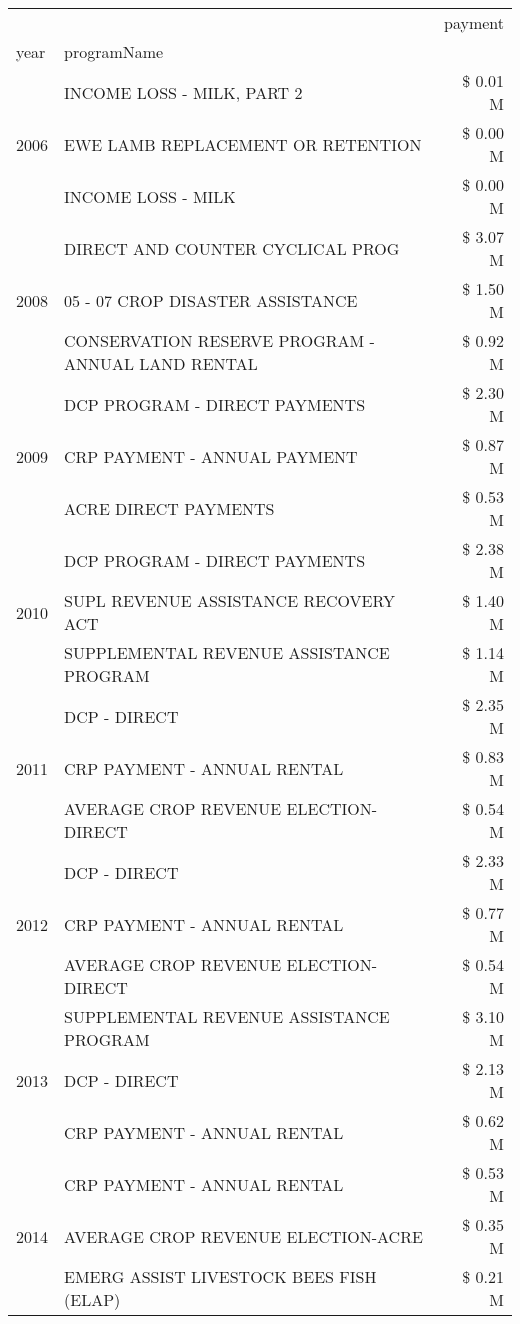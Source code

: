 \begin{tabular}{llr}
\toprule
 &  & payment \\
year & programName &  \\
\midrule
\multirow[t]{3}{*}{2006} & INCOME LOSS - MILK, PART 2 & \$ 0.01 M \\
 & EWE LAMB REPLACEMENT OR RETENTION & \$ 0.00 M \\
 & INCOME LOSS - MILK & \$ 0.00 M \\
\cline{1-3}
\multirow[t]{3}{*}{2008} & DIRECT AND COUNTER CYCLICAL PROG & \$ 3.07 M \\
 & 05 - 07 CROP DISASTER ASSISTANCE & \$ 1.50 M \\
 & CONSERVATION RESERVE PROGRAM - ANNUAL LAND RENTAL & \$ 0.92 M \\
\cline{1-3}
\multirow[t]{3}{*}{2009} & DCP PROGRAM - DIRECT PAYMENTS & \$ 2.30 M \\
 & CRP PAYMENT - ANNUAL PAYMENT & \$ 0.87 M \\
 & ACRE DIRECT PAYMENTS & \$ 0.53 M \\
\cline{1-3}
\multirow[t]{3}{*}{2010} & DCP PROGRAM - DIRECT PAYMENTS & \$ 2.38 M \\
 & SUPL REVENUE ASSISTANCE RECOVERY ACT & \$ 1.40 M \\
 & SUPPLEMENTAL REVENUE ASSISTANCE PROGRAM & \$ 1.14 M \\
\cline{1-3}
\multirow[t]{3}{*}{2011} & DCP - DIRECT & \$ 2.35 M \\
 & CRP PAYMENT - ANNUAL RENTAL & \$ 0.83 M \\
 & AVERAGE CROP REVENUE ELECTION-DIRECT & \$ 0.54 M \\
\cline{1-3}
\multirow[t]{3}{*}{2012} & DCP - DIRECT & \$ 2.33 M \\
 & CRP PAYMENT - ANNUAL RENTAL & \$ 0.77 M \\
 & AVERAGE CROP REVENUE ELECTION-DIRECT & \$ 0.54 M \\
\cline{1-3}
\multirow[t]{3}{*}{2013} & SUPPLEMENTAL REVENUE ASSISTANCE PROGRAM & \$ 3.10 M \\
 & DCP - DIRECT & \$ 2.13 M \\
 & CRP PAYMENT - ANNUAL RENTAL & \$ 0.62 M \\
\cline{1-3}
\multirow[t]{3}{*}{2014} & CRP PAYMENT - ANNUAL RENTAL & \$ 0.53 M \\
 & AVERAGE CROP REVENUE ELECTION-ACRE & \$ 0.35 M \\
 & EMERG ASSIST LIVESTOCK BEES FISH (ELAP) & \$ 0.21 M \\
\cline{1-3}

\end{tabular}
